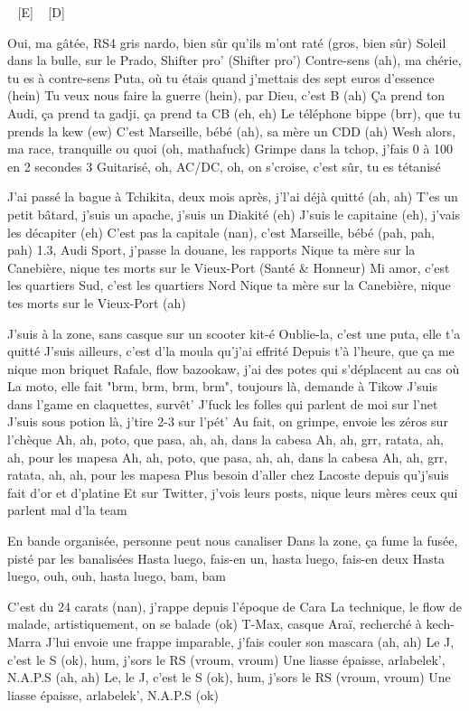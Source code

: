 

\begin{guitar}
[F#-] ~ [E] ~ [D]

	Oui, ma gâtée, RS4 gris nardo, bien sûr qu'ils m'ont raté (gros, bien sûr)
Soleil dans la bulle, sur le Prado, Shifter pro' (Shifter pro')
Contre-sens (ah), ma chérie, tu es à contre-sens
Puta, où tu étais quand j'mettais des sept euros d'essence (hein)
Tu veux nous faire la guerre (hein), par Dieu, c'est B (ah)
Ça prend ton Audi, ça prend ta gadji, ça prend ta CB (eh, eh)
Le téléphone bippe (brr), que tu prends la kew (ew)
C'est Marseille, bébé (ah), sa mère un CDD (ah)
Wesh alors, ma race, tranquille ou quoi (oh, mathafuck)
Grimpe dans la tchop, j'fais 0 à 100 en 2 secondes 3
Guitarisé, oh, AC/DC, oh, on s'croise, c'est sûr, tu es tétanisé

J'ai passé la bague à Tchikita, deux mois après, j'l'ai déjà quitté (ah, ah)
T'es un petit bâtard, j'suis un apache, j'suis un Diakité (eh)
J'suis le capitaine (eh), j'vais les décapiter (eh)
C'est pas la capitale (nan), c'est Marseille, bébé (pah, pah, pah)
1.3, Audi Sport, j'passe la douane, les rapports
Nique ta mère sur la Canebière, nique tes morts sur le Vieux-Port (Santé \& Honneur)
Mi amor, c'est les quartiers Sud, c'est les quartiers Nord
Nique ta mère sur la Canebière, nique tes morts sur le Vieux-Port (ah)

J'suis à la zone, sans casque sur un scooter kit-é
Oublie-la, c'est une puta, elle t'a quitté
J'suis ailleurs, c'est d'la moula qu'j'ai effrité
Depuis t'à l'heure, que ça me nique mon briquet
Rafale, flow bazookaw, j'ai des potes qui s'déplacent au cas où
La moto, elle fait "brm, brm, brm, brm", toujours là, demande à Tikow
J'suis dans l'game en claquettes, survêt'
J'fuck les folles qui parlent de moi sur l'net
J'suis sous potion là, j'tire 2-3 sur l'pét'
Au fait, on grimpe, envoie les zéros sur l'chèque
Ah, ah, poto, que pasa, ah, ah, dans la cabesa
Ah, ah, grr, ratata, ah, ah, pour les mapesa
Ah, ah, poto, que pasa, ah, ah, dans la cabesa
Ah, ah, grr, ratata, ah, ah, pour les mapesa
Plus besoin d'aller chez Lacoste depuis qu'j'suis fait d'or et d'platine
Et sur Twitter, j'vois leurs posts, nique leurs mères ceux qui parlent mal d'la team

En bande organisée, personne peut nous canaliser
Dans la zone, ça fume la fusée, pisté par les banalisées
Hasta luego, fais-en un, hasta luego, fais-en deux
Hasta luego, ouh, ouh, hasta luego, bam, bam

C'est du 24 carats (nan), j'rappe depuis l'époque de Cara
La technique, le flow de malade, artistiquement, on se balade (ok)
T-Max, casque Araï, recherché à kech-Marra
J'lui envoie une frappe imparable, j'fais couler son mascara (ah, ah)
Le J, c'est le S (ok), hum, j'sors le RS (vroum, vroum)
Une liasse épaisse, arlabelek', N.A.P.S (ah, ah)
Le, le J, c'est le S (ok), hum, j'sors le RS (vroum, vroum)
Une liasse épaisse, arlabelek', N.A.P.S (ok)


\end{guitar}
